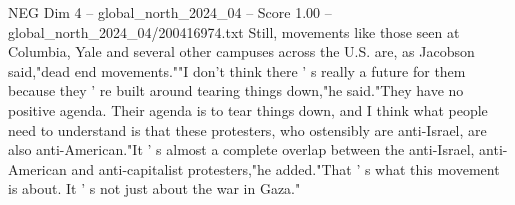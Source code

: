 \begin{textsample}{NEG Dim 4 – global\_north\_2024\_04 – Score 1.00 – global\_north\_2024\_04/200416974.txt}
Still, movements like those seen at Columbia, Yale and several other campuses across the U.S. are, as Jacobson said,"dead end movements.""I don't think there ' s really a future for them because they ' re built around tearing things down,"he said."They have no positive agenda.
Their agenda is to tear things down, and I think what people need to understand is that these protesters, who ostensibly are anti-Israel, are also anti-American."It ' s almost a complete overlap between the anti-Israel, anti-American and anti-capitalist protesters,"he added."That ' s what this movement is about.
It ' s not just about the war in Gaza."

\end{textsample}
